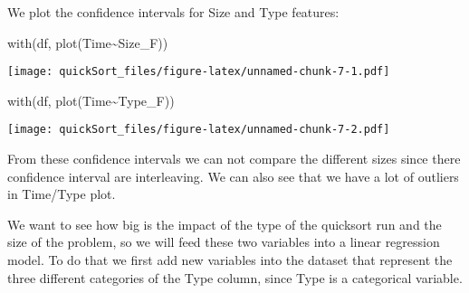 \documentclass[
]{article}
\newenvironment{Shaded}{\begin{snugshade}}{\end{snugshade}}
\newcommand{\CommentTok}[1]{\textcolor[rgb]{0.56,0.35,0.01}{\textit{#1}}}
\newcommand{\DecValTok}[1]{\textcolor[rgb]{0.00,0.00,0.81}{#1}}
\newcommand{\FunctionTok}[1]{\textcolor[rgb]{0.00,0.00,0.00}{#1}}
\newcommand{\NormalTok}[1]{#1}
\newcommand{\OtherTok}[1]{\textcolor[rgb]{0.56,0.35,0.01}{#1}}
\newcommand{\SpecialCharTok}[1]{\textcolor[rgb]{0.00,0.00,0.00}{#1}}
\newcommand{\StringTok}[1]{\textcolor[rgb]{0.31,0.60,0.02}{#1}}
\begin{document}
We plot the confidence intervals for Size and Type features:

\begin{Shaded}
\end{Shaded}

\begin{Shaded}
\begin{Highlighting}[]
\FunctionTok{with}\NormalTok{(df, }\FunctionTok{plot}\NormalTok{(Time}\SpecialCharTok{\textasciitilde{}}\NormalTok{Size\_F))}
\end{Highlighting}
\end{Shaded}

\texttt{[image: quickSort\_files/figure-latex/unnamed-chunk-7-1.pdf]}

\begin{Shaded}
\begin{Highlighting}[]
\FunctionTok{with}\NormalTok{(df, }\FunctionTok{plot}\NormalTok{(Time}\SpecialCharTok{\textasciitilde{}}\NormalTok{Type\_F))}
\end{Highlighting}
\end{Shaded}

\texttt{[image: quickSort\_files/figure-latex/unnamed-chunk-7-2.pdf]}

From these confidence intervals we can not compare the different sizes
since there confidence interval are interleaving. We can also see that
we have a lot of outliers in Time/Type plot.

We want to see how big is the impact of the type of the quicksort run
and the size of the problem, so we will feed these two variables into a
linear regression model. To do that we first add new variables into the
dataset that represent the three different categories of the Type
column, since Type is a categorical variable.

\begin{Shaded}
\end{Shaded}
\end{document}

